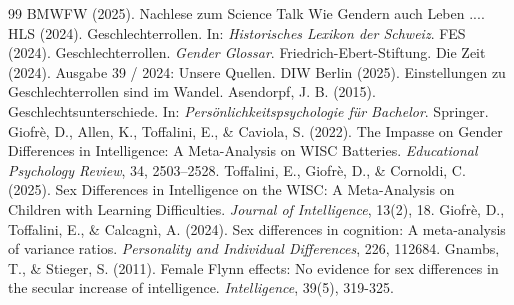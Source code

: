 \documentclass[12pt,a4paper]{article}
\begin{document}
\begin{thebibliography}{99}
		 BMWFW (2025). Nachlese zum Science Talk \glqq Wie Gendern auch Leben ...\grqq.
		 HLS (2024). Geschlechterrollen. In: \textit{Historisches Lexikon der Schweiz}.
		 FES (2024). Geschlechterrollen. \textit{Gender Glossar}. Friedrich-Ebert-Stiftung.
		 Die Zeit (2024). Ausgabe 39 / 2024: Unsere Quellen.
		 DIW Berlin (2025). Einstellungen zu Geschlechterrollen sind im Wandel.
		 Asendorpf, J. B. (2015). Geschlechtsunterschiede. In: \textit{Persönlichkeitspsychologie für Bachelor}. Springer.
		 Giofrè, D., Allen, K., Toffalini, E., \& Caviola, S. (2022). The Impasse on Gender Differences in Intelligence: A Meta-Analysis on WISC Batteries. \textit{Educational Psychology Review}, 34, 2503–2528.
		 Toffalini, E., Giofrè, D., \& Cornoldi, C. (2025). Sex Differences in Intelligence on the WISC: A Meta-Analysis on Children with Learning Difficulties. \textit{Journal of Intelligence}, 13(2), 18.
		 Giofrè, D., Toffalini, E., \& Calcagnì, A. (2024). Sex differences in cognition: A meta-analysis of variance ratios. \textit{Personality and Individual Differences}, 226, 112684.
		 Gnambs, T., \& Stieger, S. (2011). Female Flynn effects: No evidence for sex differences in the secular increase of intelligence. \textit{Intelligence}, 39(5), 319-325.
	\end{thebibliography}
\end{document}
